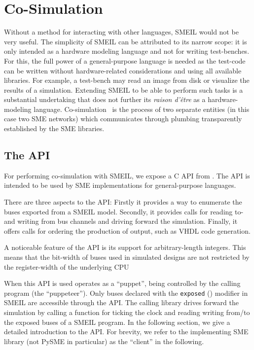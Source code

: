 \chapter{Co-Simulation}
\label{sec:cosim}

Without a method for interacting with other languages, SMEIL would not be very
useful. The simplicity of SMEIL can be attributed to its narrow scope: it is
only intended as a hardware modeling language and not for writing
test-benches. For this, the full power of a general-purpose language is needed
as the test-code can be written without hardware-related considerations and
using all available libraries. For example, a test-bench may read an image from
disk or visualize the results of a simulation. Extending SMEIL to be able to
perform such tasks is a substantial undertaking that does not further its
{\itshape raison d'être} as a hardware-modeling
language. Co-simulation~\cite{schloegl2015towards} is the process of two
separate entities (in this case two SME networks) which communicates through
plumbing transparently established by the SME libraries.

\section{The API}
For performing co-simulation with SMEIL, we expose a C API from \libsme{}. The
API is intended to be used by SME implementations for general-purpose languages.

There are three aspects to the API: Firstly it provides a way to enumerate the
buses exported from a SMEIL model. Secondly, it provides calls for reading to-
and writing from bus channels and driving forward the simulation. Finally, it
offers calls for ordering the production of output, such as VHDL code
generation.

A noticeable feature of the API is its support for arbitrary-length
integers. This means that the bit-width of buses used in simulated designs are
not restricted by the register-width of the underlying CPU


When this API is used \libsme{} operates as a ``puppet'', being controlled by
the calling program (the ``puppeteer''). Only buses declared with the
\texttt{exposed} () modifier in SMEIL are accessible through
the \libsme{} API. The calling library drives forward the simulation by calling
a function for ticking the clock and reading writing from/to the exposed buses
of a SMEIL program. In the following section, we give a detailed introduction to
the API.  For brevity, we refer to the implementing SME library (not PySME in
particular) as the ``client'' in the following.

